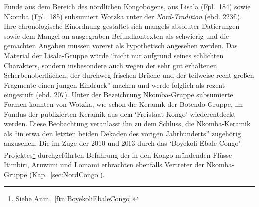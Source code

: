 Funde aus dem Bereich des nördlichen Kongobogens, aus Lisala (Fpl.~184) sowie Nkomba (Fpl.~185) subsumiert Wotzka unter der \textit{Nord-Tradition} (ebd. 223f.). Ihre chronologische Einordnung gestaltet sich mangels absoluter Datierungen sowie dem Mangel an ausgegraben Befundkontexten als schwierig und die gemachten Angaben müssen vorerst als hypothetisch angesehen werden. Das Material der Lisala-Gruppe würde \enquote{nicht nur aufgrund seines schlichten Charakters, sondern insbesondere auch wegen der sehr gut erhaltenen Scherbenoberflächen, der durchweg frischen Brüche und der teilweise recht großen Fragmente einen jungen Eindruck} machen und werde folglich als rezent eingestuft (ebd. 207). Unter der Bezeichnung Nkomba-Gruppe subsumierte Formen konnten von Wotzka, wie schon die Keramik der Botendo-Gruppe, im Fundus der publizierten Keramik aus dem \enquote*{Freistaat Kongo} \parencite[189--191 Taf.~13]{Coart.1907} wiederentdeckt werden. Diese Beobachtung veranlasst ihn zu dem Schluss, die Nkomba-Keramik als \enquote{in etwa den letzten beiden Dekaden des vorigen Jahrhunderts} \parencite[210]{Wotzka.1995} zugehörig anzusehen. Die im Zuge der 2010 und 2013 durch das \enquote*{Boyekoli Ebale Congo}-Projektes\footnote{Siehe Anm.~\ref{ftn:BoyekoliEbaleCongo}.} durchgeführten Befahrung der in den Kongo mündenden Flüsse Itimbiri, Aruwimi und Lomami erbrachten ebenfalls Vertreter der Nkomba-Gruppe (Kap.~\ref{sec:NordCongo}).

